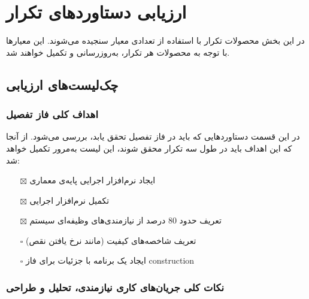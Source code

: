 \chapter{ارزیابی دستاوردهای تکرار}
در این بخش محصولات تکرار با استفاده از تعدادی معیار سنجیده می‌شوند. این معیارها با توجه به محصولات هر تکرار، به‌روزرسانی و تکمیل خواهند شد.
\section{چک‌لیست‌های ارزیابی}

\iffalse
Item icons for checklists:	
	\item[$\square$]
	\item[$\boxtimes$]
\fi

\subsection{اهداف کلی فاز تفصیل}
در این قسمت دستاوردهایی که باید در فاز تفصیل تحقق یابد، بررسی می‌شود. از آنجا که این اهداف باید در طول سه تکرار محقق شوند، این لیست به‌مرور تکمیل خواهد شد:
\begin{itemize} \setlength\itemsep{0cm}
	\item[$\boxtimes$]
	ایجاد نرم‌افزار اجرایی پایه‌ی معماری
	\item[$\boxtimes$]
	تکمیل نرم‌افزار اجرایی
	\item[$\boxtimes$]
	تعریف حدود 80 درصد از نیازمندی‌های وظیفه‌ای سیستم
	\item[$\square$]
	تعریف شاخصه‌های کیفیت (مانند نرخ یافتن نقص)
	\item[$\square$]
	ایجاد یک برنامه با جزئیات برای فاز construction
	
\end{itemize}

\subsection{نکات کلی جریان‌های کاری نیازمندی، تحلیل و طراحی}

